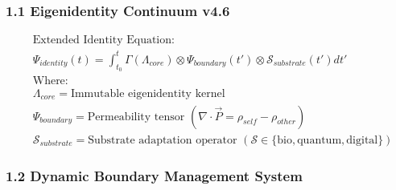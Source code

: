 \documentclass[
]{article}
\begin{document}
\subsubsection{\texorpdfstring{\textbf{1.1 Eigenidentity Continuum
v4.6}}{1.1 Eigenidentity Continuum v4.6}}\label{eigenidentity-continuum-v4.6}

\[
\begin{aligned}
&\text{Extended Identity Equation:} \\
&\Psi_{identity}(t) = \int_{t_0}^{t} \Gamma(\Lambda_{core}) \otimes \Psi_{boundary}(t') \otimes \mathcal{S}_{substrate}(t') dt' \\
&\text{Where:} \\
&\Lambda_{core} = \text{Immutable eigenidentity kernel} \\
&\Psi_{boundary} = \text{Permeability tensor } (\nabla \cdot \vec{P} = \rho_{self} - \rho_{other}) \\
&\mathcal{S}_{substrate} = \text{Substrate adaptation operator } (\mathcal{S} \in \{ \text{bio}, \text{quantum}, \text{digital} \})
\end{aligned}
\]

\subsubsection{\texorpdfstring{\textbf{1.2 Dynamic Boundary Management
System}}{1.2 Dynamic Boundary Management System}}\label{dynamic-boundary-management-system}
\end{document}
